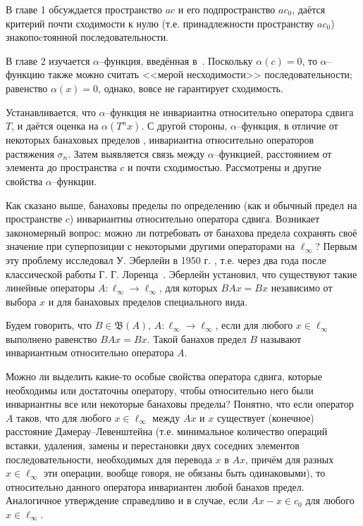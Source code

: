 В главе 1 обсуждается пространство $ac$ и его подпространство $ac_0$,
даётся критерий почти сходимости к нулю (т.е. принадлежности пространству $ac_0$)
знакопоcтоянной последовательности.




В главе 2
изучается $\alpha$--функция, введённая в~\cite{our-vzms-2018}.
%
%
Поскольку $\alpha(c)=0$,
то $\alpha$--функцию также можно считать <<мерой несходимости>> последовательности;
равенство $\alpha(x) = 0$, однако, вовсе не гарантирует сходимость.

Устанавливается, что $\alpha$--функция не инвариантна относительно оператора сдвига $T$,
и даётся оценка на $\alpha(T^n x)$.
С другой стороны, $\alpha$--функция, в отличие от некоторых банаховых пределов
\cite{Semenov2010invariant,Semenov2011dan},
инвариантна относительно операторов растяжения $\sigma_n$.
Затем выявляется связь между $\alpha$--функцией, расстоянием от элемента до пространства $c$
и почти сходимостью.
Рассмотрены и другие свойства $\alpha$--функции.




Как сказано выше, банаховы пределы по определению (как и обычный предел на пространстве $c$) инвариантны относительно оператора сдвига.
Возникает закономерный вопрос: можно ли потребовать от банахова предела сохранять своё значение
при суперпозиции с некоторыми другими операторами на $\ell_\infty$?
Первым эту проблему исследовал У. Эберлейн в 1950 г. \cite{Eberlein},
т.е. через два года после классической работы Г. Г. Лоренца~\cite{lorentz1948contribution}.
Эберлейн установил, что существуют такие линейные операторы  $A : \ell_\infty\to \ell_\infty$,
для которых $BAx = Bx$ независимо от выбора $x$ и для банаховых пределов специального вида.

Будем говорить, что $B\in\mathfrak B(A)$, $A : \ell_\infty\to \ell_\infty$, если для любого $x\in \ell_\infty$
выполнено равенство $BAx = Bx$.
Такой банахов предел $B$ называют инвариантным относительно оператора $A$.

Можно ли выделить какие-то особые свойства оператора сдвига,
которые необходимы или достаточны оператору, чтобы относительно него были инвариантны все или некоторые банаховы пределы?
Понятно, что если оператор $A$ таков, что для любого $x\in\ell_\infty$ между $Ax$ и $x$
существует (конечное) расстояние Дамерау--Левенштейна \cite{damerau1964technique} (т.е. минимальное количество операций вставки, удаления, замены и перестановки двух соседних элементов последовательности, необходимых для перевода $x$ в $Ax$, причём для разных $x\in\ell_\infty$ эти операции, вообще говоря, не обязаны быть одинаковыми), то относительно данного оператора инвариантен любой банахов предел. Аналогичное утверждение справедливо и в случае, если $Ax -x \in c_0$ для любого $x\in \ell_\infty$.

